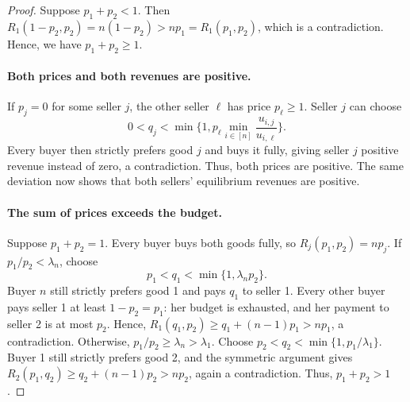 \begin{proof}
Suppose $p_1 + p_2 < 1$. Then $R_1(1 - p_2, p_2) = n (1 - p_2) > n p_1 = R_1(p_1, p_2)$, which is a contradiction.
Hence, we have $p_1 + p_2 \ge 1$.

\paragraph{Both prices and both revenues are positive.}
If $p_j = 0$ for some seller $j$, the other seller $\ell$ has price $p_\ell \ge 1$.
Seller $j$ can choose
\[ 0 < q_j < \min\bigg\{1, p_\ell \min_{i \in [n]} \frac{u_{i,j}}{u_{i,\ell}}\bigg\}. \]
Every buyer then strictly prefers good $j$ and buys it fully,
giving seller $j$ positive revenue instead of zero, a contradiction.
Thus, both prices are positive. The same deviation now shows that both sellers' equilibrium revenues are positive.

\paragraph{The sum of prices exceeds the budget.}
Suppose $p_1 + p_2 = 1$. Every buyer buys both goods fully, so $R_j(p_1, p_2) = n p_j$.
If $p_1 / p_2 < \lambda_n$, choose
\[ p_1 < q_1 < \min\{1, \lambda_n p_2\}. \]
Buyer $n$ still strictly prefers good 1 and pays $q_1$ to seller 1.
Every other buyer pays seller 1 at least $1 - p_2 = p_1$:
her budget is exhausted, and her payment to seller 2 is at most $p_2$.
Hence, $R_1(q_1, p_2) \ge q_1 + (n - 1) p_1 > n p_1$, a contradiction.
Otherwise, $p_1 / p_2 \ge \lambda_n > \lambda_1$.
Choose $p_2 < q_2 < \min\{1, p_1 / \lambda_1\}$.
Buyer 1 still strictly prefers good 2, and the symmetric argument gives
$R_2(p_1, q_2) \ge q_2 + (n - 1) p_2 > n p_2$, again a contradiction.
Thus, $p_1 + p_2 > 1$.


\end{proof}
